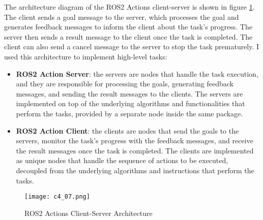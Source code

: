 The architecture diagram of the ROS2 Actions client-server is shown in figure \ref{fig:actions_architecture}.
The client sends a goal message to the server, which processes the goal and generates feedback messages
to inform the client about the task's progress. The server then sends a result message to the client
once the task is completed. The client can also send a cancel message to the server to stop the task
prematurely. I used this architecture to implement high-level tasks:

\begin{itemize}
    \item \textbf{ROS2 Action Server}: the servers are nodes that handle the task execution, and they are responsible
    for processing the goals, generating feedback messages, and sending the result messages to the clients.
    The servers are implemented on top of the underlying algorithms and functionalities that perform the tasks,
    provided by a separate node inside the same package.
    \item \textbf{ROS2 Action Client}: the clients are nodes that send the goals to the servers, monitor the task's progress
    with the feedback messages, and receive the result messages once the task is completed. The clients are implemented
    as unique nodes that handle the sequence of actions to be executed, decoupled from the underlying algorithms
    and instructions that perform the tasks.
\end{itemize}

\begin{figure}[t]
    \centering
    \texttt{[image: c4\_07.png]}
    \caption{ROS2 Actions Client-Server Architecture}
    \label{fig:actions_architecture}
\end{figure}
